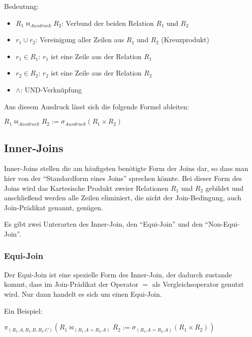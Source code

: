         Bedeutung:
        \begin{itemize}
          \item \textbf{$R_1\bowtie _{Ausdruck} R_2$}: Verbund der beiden Relation $R_1$ und $R_2$
          \item \textbf{$r_1\cup r_2$}: Vereinigung aller Zeilen aus $R_1$ und $R_2$ (Kreuzprodukt)
          \item \textbf{$r_1\in R_1$}: $r_1$ ist eine Zeile aus der Relation $R_1$
          \item \textbf{$r_2\in R_2$}: $r_2$ ist eine Zeile aus der Relation $R_2$
          \item \textbf{$\wedge$}: UND-Verknüpfung
        \end{itemize}

        Aus diesem Ausdruck lässt sich die folgende Formel ableiten:

        $R_1\bowtie _{Ausdruck} R_2 := \sigma_{Ausdruck}(R_1 \times R_2)$
\clearpage
				\subsection{Inner-Joins}
        Inner-Joins stellen die am häufigsten benötigte Form der Joins dar, so dass man hier von der \enquote{Standardform eines Joins} sprechen könnte. Bei dieser Form des Joins wird das Kartesische Produkt zweier Relationen $R_1$ und $R_2$ gebildet und anschließend werden alle Zeilen eliminiert, die nicht der Join-Bedingung, auch Join-Prädikat genannt, genügen.

        Es gibt zwei Unterarten des Inner-Join, den \enquote{Equi-Join} und den \enquote{Non-Equi-Join}.
        \subsubsection{Equi-Join}
          Der Equi-Join ist eine spezielle Form des Inner-Join, der dadurch zustande kommt, dass im Join-Prädikat der Operator $=$ als Vergleichsoperator genutzt wird. Nur dann handelt es sich um einen Equi-Join.

          Ein Beispiel:

          $\pi _{(R_1.A, R_1.B,R_2.C)}(R_1\bowtie _{(R_1.A=R_2.A)} R_2 := \sigma _{(R_1.A=R_2.A)}(R_1 \times R_2))$


